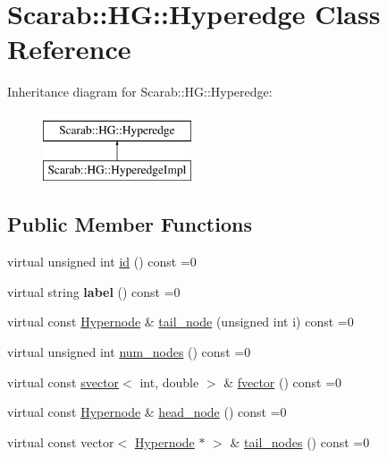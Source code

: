 \hypertarget{classScarab_1_1HG_1_1Hyperedge}{
\section{Scarab::HG::Hyperedge Class Reference}
\label{classScarab_1_1HG_1_1Hyperedge}
}
Inheritance diagram for Scarab::HG::Hyperedge:\begin{figure}[H]
\begin{center}
\leavevmode
\includegraphics[height=2cm]{classScarab_1_1HG_1_1Hyperedge}
\end{center}
\end{figure}
\subsection*{Public Member Functions}
\begin{DoxyCompactItemize}
\item 
virtual unsigned int \hyperlink{classScarab_1_1HG_1_1Hyperedge_af824beb7107253a7545b35992c17e057}{id} () const =0
\item 
\hypertarget{classScarab_1_1HG_1_1Hyperedge_a8442c017fcee87c1f865b2254b49900f}{
virtual string {\bfseries label} () const =0}
\label{classScarab_1_1HG_1_1Hyperedge_a8442c017fcee87c1f865b2254b49900f}

\item 
virtual const \hyperlink{classScarab_1_1HG_1_1Hypernode}{Hypernode} \& \hyperlink{classScarab_1_1HG_1_1Hyperedge_a9ec8cf9ea7b5f762f359a6f9f1c038da}{tail\_\-node} (unsigned int i) const =0
\item 
virtual unsigned int \hyperlink{classScarab_1_1HG_1_1Hyperedge_a799d8d98242c129d7eee178bdf1fb535}{num\_\-nodes} () const =0
\item 
virtual const \hyperlink{classsvector}{svector}$<$ int, double $>$ \& \hyperlink{classScarab_1_1HG_1_1Hyperedge_a0d201ddb955631aadee4c15cc8e709f8}{fvector} () const =0
\item 
virtual const \hyperlink{classScarab_1_1HG_1_1Hypernode}{Hypernode} \& \hyperlink{classScarab_1_1HG_1_1Hyperedge_a6043de341070c103d811f5286193dd46}{head\_\-node} () const =0
\item 
virtual const vector$<$ \hyperlink{classScarab_1_1HG_1_1Hypernode}{Hypernode} $\ast$ $>$ \& \hyperlink{classScarab_1_1HG_1_1Hyperedge_abac6d27691186608aa12949de6e1c283}{tail\_\-nodes} () const =0
\end{DoxyCompactItemize}


